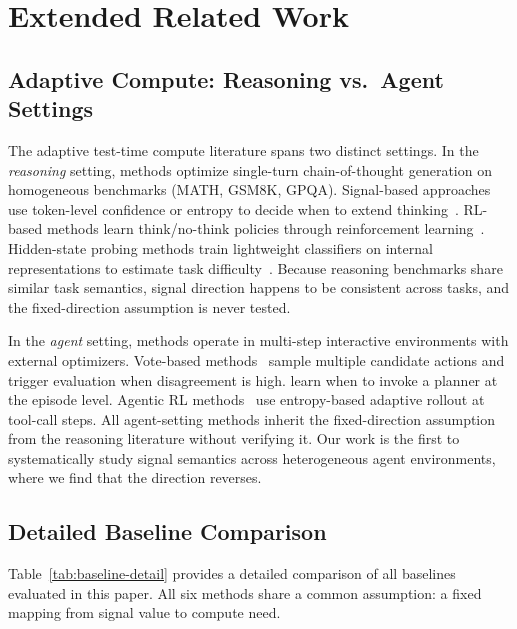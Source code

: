 \appendix

\section{Extended Related Work}
\label{app:related}

\subsection{Adaptive Compute: Reasoning vs.\ Agent Settings}

The adaptive test-time compute literature spans two distinct
settings. In the \emph{reasoning} setting, methods optimize
single-turn chain-of-thought generation on homogeneous benchmarks
(MATH, GSM8K, GPQA).
Signal-based approaches use token-level confidence or entropy to
decide when to extend
thinking~\citep{seag2025, cats2025, corefine2026,
thinkjustenough2025, s1_2025, han2025tokenbudget}.
RL-based methods learn think/no-think policies through reinforcement
learning~\citep{adaptthink2025, thinkless2025, aggarwal2025l1}.
Hidden-state probing methods train lightweight classifiers on
internal representations to estimate task
difficulty~\citep{diffadapt2025, zhu2025llmalreadyknows}.
Because reasoning benchmarks share similar task semantics, signal
direction happens to be consistent across tasks, and the
fixed-direction assumption is never tested.

In the \emph{agent} setting, methods operate in multi-step
interactive environments with external optimizers. Vote-based
methods~\citep{catts2026} sample multiple candidate actions and
trigger evaluation when disagreement is high.
\citet{paglieri2025learning} learn when to invoke a planner at
the episode level. Agentic RL methods~\citep{arpo2025} use
entropy-based adaptive rollout at tool-call steps. All agent-setting
methods inherit the fixed-direction assumption from the reasoning
literature without verifying it. Our work is the first to
systematically study signal semantics across heterogeneous agent
environments, where we find that the direction reverses.

\subsection{Detailed Baseline Comparison}
\label{app:method-comparison}

Table~\ref{tab:baseline-detail} provides a detailed comparison of all
baselines evaluated in this paper. All six methods share a common
assumption: a fixed mapping from signal value to compute need.

